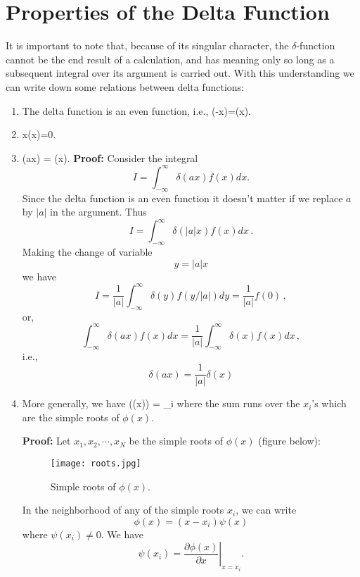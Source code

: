 \section{Properties of the Delta Function}
It is important to note that, because of its singular character, the $\delta$-function cannot be the end result of a calculation,
and has meaning only so long as a subsequent integral over its argument is carried out. With this understanding we can write
down some relations between delta functions:
\begin{enumerate}
\item
The delta function is an even function, i.e.,
\be
\delta(-x)=\delta(x).
\ee

\item
\be
x\delta(x)=0.
\ee

\item
\be
\delta(ax) =  \delta(x).
\ee
{\bf Proof:}\newline
Consider the integral
\[
I=\int_{-\infty}^{\infty}\delta(ax)f(x)dx. 
\]
Since the delta function is an even function it doesn't matter if we replace $a$ by $|a|$ in the argument. Thus
\[ I= \int_{-\infty}^{\infty} \delta(|a|x)f(x) dx \, . \]
Making the change of variable
\[ y=|a|x \]
we have
\[ I= \frac{1}{|a|} \int_{-\infty}^{\infty} \delta(y)f(y/|a|) dy= \frac{1}{|a|} f(0) \, , \]
or,
\[ \int_{-\infty}^{\infty} \delta(ax)f(x) dx  = \frac{1}{|a|} \int_{-\infty}^{\infty} \delta(x)f(x) dx \, , \]
i.e.,
\begin{equation*}
\boxed{
\delta(ax)=\frac{1}{|a|}\delta(x)
}
\end{equation*}

\item
More generally, we have
\be
\delta(\phi(x)) = \sum_i 
\ee
where the sum runs over the $x_i$'s which are the simple roots of $\phi(x)$.

\noindent
{\bf Proof:}\newline
Let $x_1, x_2, \cdots , x_N$ be the simple roots of $\phi(x)$ (figure below):
\begin{figure}[h]
\centering
\texttt{[image: roots.jpg]}
\caption{Simple roots of $\phi(x)$.}
\end{figure}

\noindent
In the neighborhood of any of the simple roots $x_i$, we can write
\[ \phi(x) = (x-x_i)\psi(x) \]
where $\psi(x_i) \neq 0$. We have
\[ \psi(x_i) = \left. \frac{\partial \phi(x)}{\partial x}\right|_{x=x_i}. \]


\end{enumerate}
